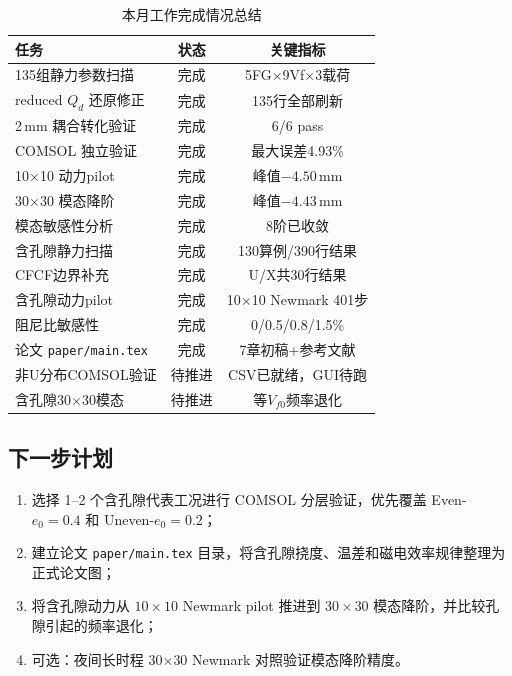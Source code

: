 \documentclass[12pt,a4paper]{ctexart}
\begin{document}
\begin{table}[H]
\centering
\caption{本月工作完成情况总结}
\label{tab:summary}
\begin{tabular}{p{4cm}cc}
\toprule
\textbf{任务} & \textbf{状态} & \textbf{关键指标} \\
\midrule
135组静力参数扫描 & \textcolor{passgreen}{完成} & 5FG$\times$9Vf$\times$3载荷 \\
reduced $Q_d$ 还原修正 & \textcolor{passgreen}{完成} & 135行全部刷新 \\
2\,mm 耦合转化验证 & \textcolor{passgreen}{完成} & 6/6 pass \\
COMSOL 独立验证 & \textcolor{passgreen}{完成} & 最大误差4.93\% \\
10$\times$10 动力pilot & \textcolor{passgreen}{完成} & 峰值$-4.50$\,mm \\
30$\times$30 模态降阶 & \textcolor{passgreen}{完成} & 峰值$-4.43$\,mm \\
模态敏感性分析 & \textcolor{passgreen}{完成} & 8阶已收敛 \\
含孔隙静力扫描 & \textcolor{passgreen}{完成} & 130算例/390行结果 \\
CFCF边界补充 & \textcolor{passgreen}{完成} & U/X共30行结果 \\
含孔隙动力pilot & \textcolor{passgreen}{完成} & 10$\times$10 Newmark 401步 \\
阻尼比敏感性 & \textcolor{passgreen}{完成} & 0/0.5/0.8/1.5\% \\
论文 \texttt{paper/main.tex} & \textcolor{passgreen}{完成} & 7章初稿+参考文献 \\
\midrule
非U分布COMSOL验证 & \textcolor{warnblue}{待推进} & CSV已就绪，GUI待跑 \\
含孔隙30$\times$30模态 & \textcolor{warnblue}{待推进} & 等$V_{f0}$频率退化 \\
\bottomrule
\end{tabular}
\end{table}

\subsection{下一步计划}

\begin{enumerate}
\item 选择 1--2 个含孔隙代表工况进行 COMSOL 分层验证，优先覆盖 Even-$e_0=0.4$ 和 Uneven-$e_0=0.2$；
\item 建立论文 \texttt{paper/main.tex} 目录，将含孔隙挠度、温差和磁电效率规律整理为正式论文图；
\item 将含孔隙动力从 $10\times10$ Newmark pilot 推进到 $30\times30$ 模态降阶，并比较孔隙引起的频率退化；
\item 可选：夜间长时程 30$\times$30 Newmark 对照验证模态降阶精度。
\end{enumerate}
\end{document}
